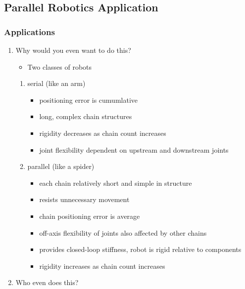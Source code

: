 \documentclass[11pt]{article}
\begin{document}
\subsection{Parallel Robotics Application}
\label{sec:orge1f5296}
\subsubsection{Applications}
\label{sec:org94d6c39}

\begin{enumerate}
\item Why would you even want to do this?
\label{sec:orgb4944b9}

\begin{itemize}
\item Two classes of robots
\end{itemize}

\begin{enumerate}
\item serial (like an arm)
\label{sec:org2873d88}

\begin{itemize}
\item positioning error is cumumlative
\item long, complex chain structures
\item rigidity decreases as chain count increases
\item joint flexibility dependent on upstream and downstream joints
\end{itemize}

\item parallel (like a spider)
\label{sec:orgad00264}

\begin{itemize}
\item each chain relatively short and simple in structure
\item resists unnecessary movement
\item chain positioning error is average
\item off-axis flexibility of joints also affected by other chains
\item provides closed-loop stiffness, robot is rigid relative to components
\item rigidity increases as chain count increases
\end{itemize}
\end{enumerate}

\item Who even does this?
\label{sec:org2b58de4}


\end{enumerate}
\end{document}
